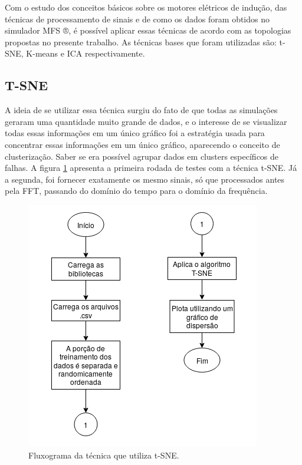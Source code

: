 Com o estudo dos conceitos básicos sobre os motores elétricos de indução, das técnicas de processamento de sinais e de como os dados foram
obtidos no simulador MFS ®, é possível aplicar essas técnicas de acordo com as topologias propostas no presente trabalho. As técnicas
bases que foram utilizadas são: t-SNE, K-means e ICA respectivamente.


%  

\subsection{T-SNE}

A ideia de se utilizar essa técnica surgiu do fato de que todas as simulações geraram uma quantidade muito grande de dados, e o interesse
de se visualizar todas essas informações em um único gráfico foi a estratégia usada para concentrar essas informações em um único 
gráfico, aparecendo o conceito de clusterização. Saber se era possível agrupar dados em clusters específicos de falhas. A figura 
\ref{fig:t-sne} apresenta a primeira rodada de testes com a técnica t-SNE. Já a segunda, foi fornecer exatamente os mesmo sinais, só que
processados antes pela FFT, passando do domínio do tempo para o domínio da frequência.

\begin{figure}[H]
    \caption{Fluxograma da técnica que utiliza t-SNE.}
    \begin{center}
        \includegraphics[scale=.65]{metodologia/img/t-sne.png}
    \end{center}
    \label{fig:t-sne}
\end{figure}

